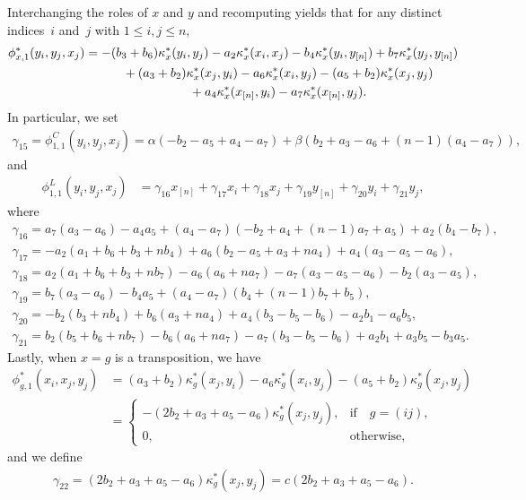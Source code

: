 \documentclass[pdftex]{sigma}
\numberwithin{equation}{section}
\begin{document}
Interchanging the roles of $x$ and $y$ and recomputing %
yields that for any distinct indices~$i$ and~$j$ with $1 \leq i, j \leq n$,
\begin{gather*}
\phi_{x,1}^*(y_i,y_j,x_j)
=-(b_3+b_6) \kappa^*_x(y_i,y_j) - a_2 \kappa^*_x(x_i,x_j) - b_4 \kappa^*_x(y_i,y_{[n]}) + b_7 \kappa^*_x(y_j,y_{[n]})
\\ \hphantom{\phi_{x,1}^*(y_i,y_j,x_j)=}
{}+(a_3+b_2) \kappa^*_x(x_j,y_i) - a_6 \kappa^*_x(x_i,y_j) - (a_5+b_2) \kappa^*_x(x_j,y_j)
\\ \hphantom{\phi_{x,1}^*(y_i,y_j,x_j)=}
{}+ a_4 \kappa^*_x(x_{[n]},y_i) - a_7 \kappa^*_x(x_{[n]},y_j).
\end{gather*}
In particular, we set
\begin{gather*}
\gamma_{15}=\phi_{1,1}^C(y_i,y_j,x_j)=\alpha(-b_2-a_5+a_4-a_7)+\beta(b_2+a_3-a_6+(n-1)(a_4-a_7)),
\end{gather*}
 and
\begin{align*}
\phi_{1,1}^L(y_i,y_j,x_j)
&=\gamma_{16} x_{[n]} +\gamma_{17} x_i +\gamma_{18} x_j +\gamma_{19}y_{[n]} +\gamma_{20}y_i +\gamma_{21}y_j,
\end{align*}
where
\begin{gather*}
\gamma_{16}=a_7(a_3 - a_6) - a_4 a_5 + (a_4-a_7)(-b_2 + a_4 + (n-1)a_7 + a_5) + a_2(b_4 - b_7), \\
\gamma_{17}=-a_2(a_1 + b_6 + b_3 + nb_4) + a_6(b_2 - a_5 + a_3 + na_4) + a_4(a_3 - a_5 - a_6), \\
\gamma_{18}=a_2(a_1 + b_6 + b_3 + nb_7) - a_6(a_6 + na_7) - a_7(a_3 - a_5 - a_6) - b_2(a_3 - a_5), \\
\gamma_{19}=b_7(a_3 - a_6) - b_4 a_5 + (a_4 - a_7)(b_4 + (n-1) b_7 + b_5), \\
\gamma_{20}=-b_2(b_3 + nb_4) + b_6(a_3 + na_4) + a_4(b_3 - b_5 - b_6) - a_2 b_1 - a_6 b_5, \\
\gamma_{21}=b_2(b_5 + b_6 + nb_7) - b_6(a_6 + na_7) - a_7(b_3 - b_5 - b_6) + a_2 b_1 + a_3 b_5 - b_3 a_5.
\end{gather*}
Lastly, when $x=g$ is a transposition, we have
\begin{align*}
\phi_{g,1}^*(x_i,x_j,y_j)&=(a_3 + b_2)\kappa^*_g(x_j,y_i) - a_6\kappa^*_g(x_i,y_j) - (a_5 + b_2)\kappa^*_g(x_j,y_j) \\
&=
\begin{cases}
 -(2b_2 + a_3 + a_5 - a_6)\kappa^*_g(x_j,y_j), & \text{if}\quad g=(ij), \\
 0, & \text{otherwise,}
\end{cases}
\end{align*}
and we define
\begin{gather*}
\gamma_{22}=(2b_2 + a_3 + a_5 - a_6)\kappa^*_g(x_j,y_j)=c(2b_2 + a_3 + a_5 - a_6).
\end{gather*}
\end{document}
